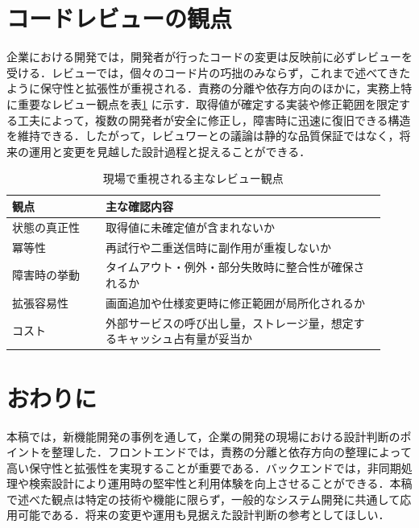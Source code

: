 \documentclass[twocolumn, 10pt]{jsarticle}
\begin{document}
\section{コードレビューの観点}

企業における開発では，開発者が行ったコードの変更は反映前に必ずレビューを受ける．レビューでは，個々のコード片の巧拙のみならず，これまで述べてきたように保守性と拡張性が重視される．責務の分離や依存方向のほかに，実務上特に重要なレビュー観点を表\ref{tb:review} に示す\cite{fowler2018refactoring,martin2017cleanarchitecture}．取得値が確定する実装や修正範囲を限定する工夫によって，複数の開発者が安全に修正し，障害時に迅速に復旧できる構造を維持できる．したがって，レビュワーとの議論は静的な品質保証ではなく，将来の運用と変更を見越した設計過程と捉えることができる．

\begin{table}[t]
    \centering
    \caption{現場で重視される主なレビュー観点}
    \label{tb:review}
    \begin{tabular}{>{\raggedright\arraybackslash}p{0.23\linewidth} >{\raggedright\arraybackslash}p{0.69\linewidth}}
        \toprule
        観点 & 主な確認内容 \\
        \midrule
        状態の真正性 & 取得値に未確定値が含まれないか\\
        冪等性 & 再試行や二重送信時に副作用が重複しないか \\
        障害時の挙動 & タイムアウト・例外・部分失敗時に整合性が確保されるか \\
        拡張容易性 & 画面追加や仕様変更時に修正範囲が局所化されるか \\
        コスト & 外部サービスの呼び出し量，ストレージ量，想定するキャッシュ占有量が妥当か \\
        \bottomrule
    \end{tabular}
\end{table}


\section{おわりに}

本稿では，新機能開発の事例を通して，企業の開発の現場における設計判断のポイントを整理した．フロントエンドでは，責務の分離と依存方向の整理によって高い保守性と拡張性を実現することが重要である．バックエンドでは，非同期処理や検索設計により運用時の堅牢性と利用体験を向上させることができる．本稿で述べた観点は特定の技術や機能に限らず，一般的なシステム開発に共通して応用可能である．将来の変更や運用も見据えた設計判断の参考としてほしい．


\end{document}

